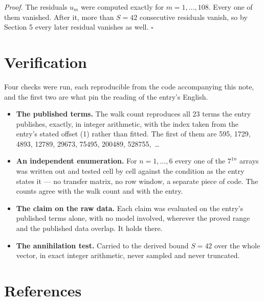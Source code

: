 \documentclass[11pt]{article}
\theoremstyle{definition}
\begin{document}
{\itshape Proof.} The residuals $u_m$ were computed exactly for $m = 1,\dots,108$. Every one of them vanished. After it, more than $S = 42$ consecutive residuals vanish, so by Section 5 every later residual vanishes as well. $\square$

\section{Verification}

Four checks were run, each reproducible from the code accompanying this note, and the first two are what pin the reading of the entry's English.

\begin{itemize}

\item {\bfseries The published terms.} The walk count reproduces all 23 terms the entry publishes, exactly, in integer arithmetic, with the index taken from the entry's stated offset (1) rather than fitted. The first of them are 595, 1729, 4893, 12789, 29673, 75495, 200489, 528755,~\dots

\item {\bfseries An independent enumeration.} For $n = 1,\dots,6$ every one of the $7^{1n}$ arrays was written out and tested cell by cell against the condition as the entry states it --- no transfer matrix, no row window, a separate piece of code. The counts agree with the walk count and with the entry.

\item {\bfseries The claim on the raw data.} Each claim was evaluated on the entry's published terms alone, with no model involved, wherever the proved range and the published data overlap. It holds there.

\item {\bfseries The annihilation test.} Carried to the derived bound $S = 42$ over the whole vector, in exact integer arithmetic, never sampled and never truncated.

\end{itemize}

\section{References}
\end{document}
